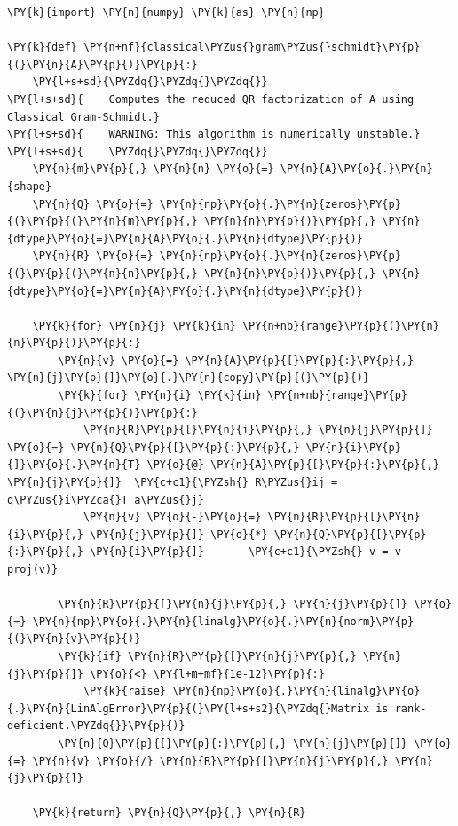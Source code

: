 \begin{verbatim}
\PY{k}{import} \PY{n}{numpy} \PY{k}{as} \PY{n}{np}

\PY{k}{def} \PY{n+nf}{classical\PYZus{}gram\PYZus{}schmidt}\PY{p}{(}\PY{n}{A}\PY{p}{)}\PY{p}{:}
    \PY{l+s+sd}{\PYZdq{}\PYZdq{}\PYZdq{}}
\PY{l+s+sd}{    Computes the reduced QR factorization of A using Classical Gram-Schmidt.}
\PY{l+s+sd}{    WARNING: This algorithm is numerically unstable.}
\PY{l+s+sd}{    \PYZdq{}\PYZdq{}\PYZdq{}}
    \PY{n}{m}\PY{p}{,} \PY{n}{n} \PY{o}{=} \PY{n}{A}\PY{o}{.}\PY{n}{shape}
    \PY{n}{Q} \PY{o}{=} \PY{n}{np}\PY{o}{.}\PY{n}{zeros}\PY{p}{(}\PY{p}{(}\PY{n}{m}\PY{p}{,} \PY{n}{n}\PY{p}{)}\PY{p}{,} \PY{n}{dtype}\PY{o}{=}\PY{n}{A}\PY{o}{.}\PY{n}{dtype}\PY{p}{)}
    \PY{n}{R} \PY{o}{=} \PY{n}{np}\PY{o}{.}\PY{n}{zeros}\PY{p}{(}\PY{p}{(}\PY{n}{n}\PY{p}{,} \PY{n}{n}\PY{p}{)}\PY{p}{,} \PY{n}{dtype}\PY{o}{=}\PY{n}{A}\PY{o}{.}\PY{n}{dtype}\PY{p}{)}

    \PY{k}{for} \PY{n}{j} \PY{k}{in} \PY{n+nb}{range}\PY{p}{(}\PY{n}{n}\PY{p}{)}\PY{p}{:}
        \PY{n}{v} \PY{o}{=} \PY{n}{A}\PY{p}{[}\PY{p}{:}\PY{p}{,} \PY{n}{j}\PY{p}{]}\PY{o}{.}\PY{n}{copy}\PY{p}{(}\PY{p}{)}
        \PY{k}{for} \PY{n}{i} \PY{k}{in} \PY{n+nb}{range}\PY{p}{(}\PY{n}{j}\PY{p}{)}\PY{p}{:}
            \PY{n}{R}\PY{p}{[}\PY{n}{i}\PY{p}{,} \PY{n}{j}\PY{p}{]} \PY{o}{=} \PY{n}{Q}\PY{p}{[}\PY{p}{:}\PY{p}{,} \PY{n}{i}\PY{p}{]}\PY{o}{.}\PY{n}{T} \PY{o}{@} \PY{n}{A}\PY{p}{[}\PY{p}{:}\PY{p}{,} \PY{n}{j}\PY{p}{]}  \PY{c+c1}{\PYZsh{} R\PYZus{}ij = q\PYZus{}i\PYZca{}T a\PYZus{}j}
            \PY{n}{v} \PY{o}{-}\PY{o}{=} \PY{n}{R}\PY{p}{[}\PY{n}{i}\PY{p}{,} \PY{n}{j}\PY{p}{]} \PY{o}{*} \PY{n}{Q}\PY{p}{[}\PY{p}{:}\PY{p}{,} \PY{n}{i}\PY{p}{]}       \PY{c+c1}{\PYZsh{} v = v - proj(v)}

        \PY{n}{R}\PY{p}{[}\PY{n}{j}\PY{p}{,} \PY{n}{j}\PY{p}{]} \PY{o}{=} \PY{n}{np}\PY{o}{.}\PY{n}{linalg}\PY{o}{.}\PY{n}{norm}\PY{p}{(}\PY{n}{v}\PY{p}{)}
        \PY{k}{if} \PY{n}{R}\PY{p}{[}\PY{n}{j}\PY{p}{,} \PY{n}{j}\PY{p}{]} \PY{o}{<} \PY{l+m+mf}{1e-12}\PY{p}{:}
            \PY{k}{raise} \PY{n}{np}\PY{o}{.}\PY{n}{linalg}\PY{o}{.}\PY{n}{LinAlgError}\PY{p}{(}\PY{l+s+s2}{\PYZdq{}Matrix is rank-deficient.\PYZdq{}}\PY{p}{)}
        \PY{n}{Q}\PY{p}{[}\PY{p}{:}\PY{p}{,} \PY{n}{j}\PY{p}{]} \PY{o}{=} \PY{n}{v} \PY{o}{/} \PY{n}{R}\PY{p}{[}\PY{n}{j}\PY{p}{,} \PY{n}{j}\PY{p}{]}

    \PY{k}{return} \PY{n}{Q}\PY{p}{,} \PY{n}{R}


\end{verbatim}
